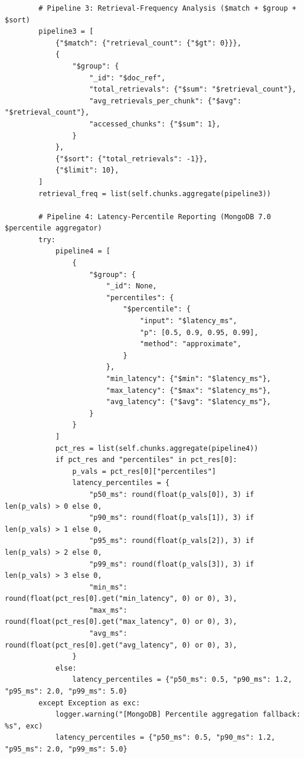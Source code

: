 \documentclass[12pt,a4paper]{report}
\begin{document}
\begin{lstlisting}
        # Pipeline 3: Retrieval-Frequency Analysis ($match + $group + $sort)
        pipeline3 = [
            {"$match": {"retrieval_count": {"$gt": 0}}},
            {
                "$group": {
                    "_id": "$doc_ref",
                    "total_retrievals": {"$sum": "$retrieval_count"},
                    "avg_retrievals_per_chunk": {"$avg": "$retrieval_count"},
                    "accessed_chunks": {"$sum": 1},
                }
            },
            {"$sort": {"total_retrievals": -1}},
            {"$limit": 10},
        ]
        retrieval_freq = list(self.chunks.aggregate(pipeline3))

        # Pipeline 4: Latency-Percentile Reporting (MongoDB 7.0 $percentile aggregator)
        try:
            pipeline4 = [
                {
                    "$group": {
                        "_id": None,
                        "percentiles": {
                            "$percentile": {
                                "input": "$latency_ms",
                                "p": [0.5, 0.9, 0.95, 0.99],
                                "method": "approximate",
                            }
                        },
                        "min_latency": {"$min": "$latency_ms"},
                        "max_latency": {"$max": "$latency_ms"},
                        "avg_latency": {"$avg": "$latency_ms"},
                    }
                }
            ]
            pct_res = list(self.chunks.aggregate(pipeline4))
            if pct_res and "percentiles" in pct_res[0]:
                p_vals = pct_res[0]["percentiles"]
                latency_percentiles = {
                    "p50_ms": round(float(p_vals[0]), 3) if len(p_vals) > 0 else 0,
                    "p90_ms": round(float(p_vals[1]), 3) if len(p_vals) > 1 else 0,
                    "p95_ms": round(float(p_vals[2]), 3) if len(p_vals) > 2 else 0,
                    "p99_ms": round(float(p_vals[3]), 3) if len(p_vals) > 3 else 0,
                    "min_ms": round(float(pct_res[0].get("min_latency", 0) or 0), 3),
                    "max_ms": round(float(pct_res[0].get("max_latency", 0) or 0), 3),
                    "avg_ms": round(float(pct_res[0].get("avg_latency", 0) or 0), 3),
                }
            else:
                latency_percentiles = {"p50_ms": 0.5, "p90_ms": 1.2, "p95_ms": 2.0, "p99_ms": 5.0}
        except Exception as exc:
            logger.warning("[MongoDB] Percentile aggregation fallback: %s", exc)
            latency_percentiles = {"p50_ms": 0.5, "p90_ms": 1.2, "p95_ms": 2.0, "p99_ms": 5.0}


\end{lstlisting}
\end{document}
